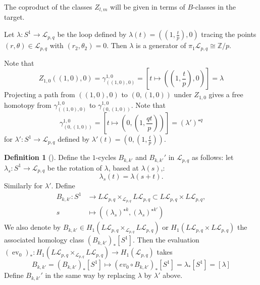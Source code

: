 \documentclass[reqno]{amsart}
\theoremstyle{definition}
\newtheorem{definition}[theorem]{Definition}
\theoremstyle{remark}
\DeclareMathOperator{\ev}{ev}
\begin{document}
The coproduct of the classes
$Z_{l,m}$ will be given in terms of $B$-classes in the
target.


Let $\lambda \colon S^{1} \to \mathcal{L}_{p,q}$ be the
loop defined by $\lambda(t) = \left( (1, \frac{t}{p}),
0
\right) $ tracing the points $(r,\theta) \in \mathcal{L}_{p,q}$ 
with $\left( r_2, \theta_2 \right) = 0$. Then
$\lambda$ is a generator of
$\pi_1 \mathcal{L}_{p,q} \cong \mathbb{Z} / p$.

Note that
\[
    Z_{1,0}\left( (1,0), 0 \right) =
    \gamma_{\left( (1,0), 0 \right) }^{1,0} = 
    \left[ t \mapsto \left( (1, \frac{t}{p}), 0  \right)  \right] = 
    \lambda
\] 
Projecting a path
from $\left( \left( 1,0 \right) , 0 \right) $ to
$\left( 0, (1,0) \right) $ under
$Z_{1,0}$ gives a free homotopy
from
$\gamma_{\left( (1,0),0 \right) }^{1,0}$ to
$\gamma_{\left( 0, (1,0) \right) }^{1,0}$. Note that
\[
\gamma_{\left( 0, (1,0) \right) }^{1,0} = 
\left[ t \mapsto \left( 0, (1, \frac{qt}{p}) \right)  \right] 
= ( \lambda' )^{\star q}
\] 
for $\lambda' \colon S^{1} \to \mathcal{L}_{p,q}$ defined
by $\lambda' (t) = \left( 0, (1, \frac{t}{p}) \right) $.

\begin{definition}[]
    Define the $1$-cycles $B_{k,k'}$ and
    $B_{k,k'}'$ in
    $\mathcal{L}_{p,q}$ as follows:
    let $\lambda_s \colon S^{1} \to \mathcal{L}_{p,q}$ be the
    rotation of $\lambda$, based at $\lambda(s)$,:
    \[
    \lambda_s (t) = \lambda (s+t).
    \] 
    Similarly for $\lambda'$.
    Define
    \begin{align*}
        B_{k,k'} \colon S^{1} 
        &\to L \mathcal{L}_{p,q} \times_{\mathcal{L}_{p,q}}
        L \mathcal{L}_{p,q} \subset L \mathcal{L}_{p,q} \times 
        L \mathcal{L}_{p,q},\\
        s 
        &\mapsto \left( (\lambda_s)^{\star k},
        (\lambda_s)^{\star k' }\right) 
    \end{align*}
    We also denote by
    $B_{k,k'} \in H_1 \left( L \mathcal{L}_{p,q}
    \times_{\mathcal{L}_{p,q}} L \mathcal{L}_{p,q} \right) $ 
    or $H_1 \left( L \mathcal{L}_{p,q} \times L \mathcal{L}_{p,q} \right) $ 
    the associated homology class
    $\left( B_{k,k'} \right)_* \left[ S^{1} \right] $.
    Then the evaluation $\left( \ev_0 \right)_* \colon
    H_1 \left( L \mathcal{L}_{p,q} \times_{\mathcal{L}_{p,q}}
    L \mathcal{L}_{p,q}\right) \to 
    H_1 \left( \mathcal{L}_{p,q} \right) $ takes
     \[
     B_{k,k'} = \left( B_{k,k'} \right)_* \left[ S^{1} \right] 
     \mapsto \left( ev_0 \circ B_{k,k'} \right)_* \left[ S^{1} \right] 
     = \lambda_* \left[ S^{1} \right] = 
     \left[ \lambda \right] 
     \] 
     Define $B_{k,k'}'$ in the same way by
     replacing $\lambda$ by $\lambda'$ above.
\end{definition}
\end{document}
